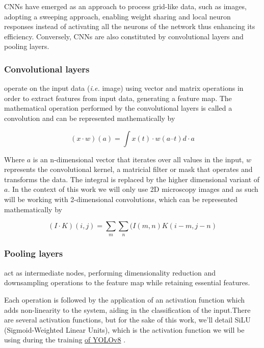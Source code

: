 \documentclass[runningheads]{llncs}
\begin{document}
CNNs have emerged as an approach to process grid-like data, such as images, adopting a sweeping approach, enabling weight sharing and local neuron responses instead of activating all the neurons of the network thus enhancing its efficiency. Conversely, CNNs are also constituted by convolutional layers and pooling layers.

\subsubsection{Convolutional layers} operate on the input data (\textit{i.e.} image) using vector and matrix operations in order to extract features from input data, generating a feature map. The mathematical operation performed by the convolutional layers is called a convolution and can be represented mathematically by

\begin{equation} \label{eq2}
    (x \cdot w)(a) = \int x(t) \cdot w(a – t) d \cdot a
\end{equation}

Where $a$ is an n-dimensional vector that iterates over all values in the input, $w$ represents the convolutional kernel, a matricial filter or mask that operates and transforms the data. The integral is replaced by the higher dimensional variant of $a$. In the context of this work we will only use 2D microscopy images and as such will be working with 2-dimensional convolutions, which can be represented mathematically by

\begin{equation}
    (I \cdot K)(i,j) = \sum_{m} \sum_{n}(I(m,n)K(i-m,j-n)
\end{equation}

\subsubsection{Pooling layers} act as intermediate nodes, performing dimensionality reduction and downsampling operations to the feature map while retaining essential features.  

Each operation is followed by the application of an activation function which adds non-linearity to the system, aiding in the classification of the input.There are several activation functions, but for the sake of this work, we'll detail SiLU (Sigmoid-Weighted Linear Units), which is the activation function we will be using during the training \href{https://blog.roboflow.com/a-thorough-breakdown-of-yolov4/}{of YOLOv8} \cite{teuwen2020}.
\end{document}

